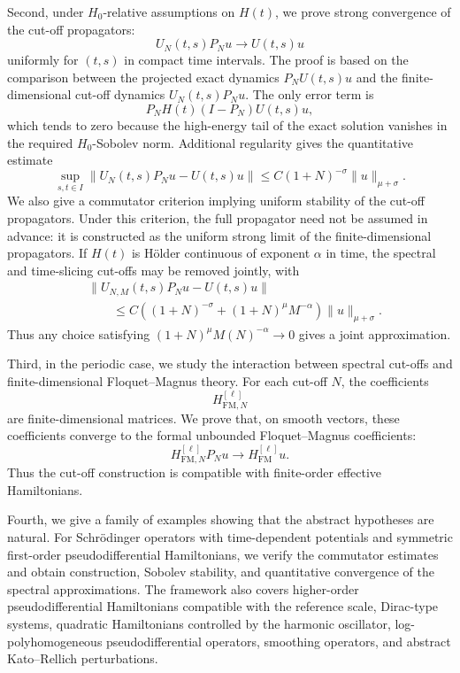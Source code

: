 \documentclass[11pt]{amsart}
\theoremstyle{plain}
\theoremstyle{definition}
\theoremstyle{remark}
\begin{document}
Second, under \(H_0\)-relative assumptions on \(H(t)\), we prove strong
convergence of the cut-off propagators:
\[
        U_N(t,s)P_Nu\longrightarrow U(t,s)u
\]
uniformly for \((t,s)\) in compact time intervals.  The proof is based
on the comparison between the projected exact dynamics
\(P_NU(t,s)u\) and the finite-dimensional cut-off dynamics
\(U_N(t,s)P_Nu\).  The only error term is
\[
        P_NH(t)(I-P_N)U(t,s)u,
\]
which tends to zero because the high-energy tail of the exact solution
vanishes in the required \(H_0\)-Sobolev norm.  Additional regularity
gives the quantitative estimate
\[
        \sup_{s,t\in I}
        \|U_N(t,s)P_Nu-U(t,s)u\|
        \leq
        C(1+N)^{-\sigma}\|u\|_{\mu+\sigma}.
\]
We also give a commutator criterion implying uniform stability of the
cut-off propagators.  Under this criterion, the full propagator need not
be assumed in advance: it is constructed as the uniform strong limit of
the finite-dimensional propagators.  If \(H(t)\) is H\"older continuous
of exponent \(\alpha\) in time, the spectral and time-slicing cut-offs
may be removed jointly, with
\[
\begin{aligned}
        &\|U_{N,M}(t,s)P_Nu-U(t,s)u\| \\
        &\qquad\leq
        C\left((1+N)^{-\sigma}+(1+N)^\mu M^{-\alpha}\right)
        \|u\|_{\mu+\sigma}.
\end{aligned}
\]
Thus any choice satisfying
\((1+N)^\mu M(N)^{-\alpha}\to0\) gives a joint approximation.

Third, in the periodic case, we study the interaction between spectral
cut-offs and finite-dimensional Floquet--Magnus theory.  For each
cut-off \(N\), the coefficients
\[
        H_{\mathrm{FM},N}^{[\ell]}
\]
are finite-dimensional matrices.  We prove that, on smooth vectors,
these coefficients converge to the formal unbounded
Floquet--Magnus coefficients:
\[
        H_{\mathrm{FM},N}^{[\ell]}P_Nu
        \longrightarrow
        H_{\mathrm{FM}}^{[\ell]}u.
\]
Thus the cut-off construction is compatible with finite-order effective
Hamiltonians.

Fourth, we give a family of examples showing that the abstract
hypotheses are natural.  For Schr\"odinger operators with time-dependent
potentials and symmetric first-order pseudodifferential Hamiltonians,
we verify the commutator estimates and obtain construction, Sobolev
stability, and quantitative convergence of the spectral approximations.
The framework also covers higher-order pseudodifferential Hamiltonians
compatible with the reference scale, Dirac-type systems, quadratic
Hamiltonians controlled by the harmonic oscillator, log-polyhomogeneous
pseudodifferential operators, smoothing operators, and abstract
Kato--Rellich perturbations.
\end{document}
